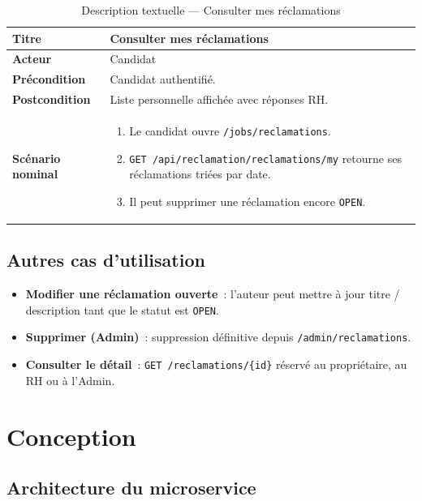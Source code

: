 \begin{table}[htbp]
  \centering
  \small
  \caption{Description textuelle --- Consulter mes réclamations}
  \label{tab:uc-my-reclamations}
  \begin{tabular}{|p{3.0cm}|p{10.2cm}|}
    \hline
    \textbf{Titre} & Consulter mes réclamations \\
    \hline
    \textbf{Acteur} & Candidat \\
    \hline
    \textbf{Précondition} & Candidat authentifié. \\
    \hline
    \textbf{Postcondition} & Liste personnelle affichée avec réponses RH. \\
    \hline
    \textbf{Scénario nominal}
    &
    \begin{enumerate}[leftmargin=*,itemsep=0.15em,topsep=0.2em]
      \item Le candidat ouvre \texttt{/jobs/reclamations}.
      \item \texttt{GET /api/reclamation/reclamations/my} retourne ses
            réclamations triées par date.
      \item Il peut supprimer une réclamation encore \texttt{OPEN}.
    \end{enumerate}
    \\
    \hline
  \end{tabular}
\end{table}


\subsection{Autres cas d'utilisation}

\begin{itemize}
  \item \textbf{Modifier une réclamation ouverte}~: l'auteur peut mettre
        à jour titre / description tant que le statut est \texttt{OPEN}.
  \item \textbf{Supprimer (Admin)}~: suppression définitive depuis
        \texttt{/admin/reclamations}.
  \item \textbf{Consulter le détail}~:
        \texttt{GET /reclamations/\{id\}} réservé au propriétaire, au RH
        ou à l'Admin.
\end{itemize}


\section{Conception}

\subsection{Architecture du microservice}


